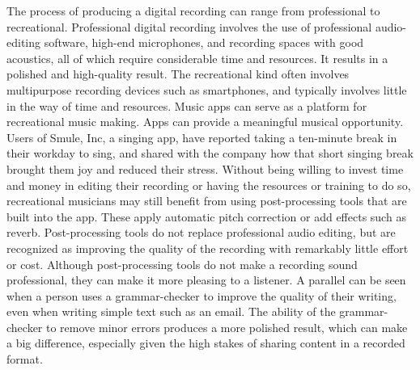 The process of producing a digital recording can range from professional to recreational. Professional digital recording involves the use of professional audio-editing software, high-end microphones, and recording spaces with good acoustics, all of which require considerable time and resources. It results in a polished and high-quality result. The recreational kind often involves multipurpose recording devices such as smartphones, and typically involves little in the way of time and resources. Music apps can serve as a platform for recreational music making. Apps can provide a meaningful musical opportunity. Users of Smule, Inc, a singing app, have reported taking a ten-minute break in their workday to sing, and shared with the company how that short singing break brought them joy and reduced their stress. Without being willing to invest time and money in editing their recording or having the resources or training to do so, recreational musicians may still benefit from using post-processing tools that are built into the app. These apply automatic pitch correction or add effects such as reverb. Post-processing tools do not replace professional audio editing, but are recognized as improving the quality of the recording with remarkably little effort or cost. Although post-processing tools do not make a recording sound professional, they can make it more pleasing to a listener. A parallel can be seen when a person uses a grammar-checker to improve the quality of their writing, even when writing simple text such as an email. The ability of the grammar-checker to remove minor errors produces a more polished result, which can make a big difference, especially given the high stakes of sharing content in a recorded format.

